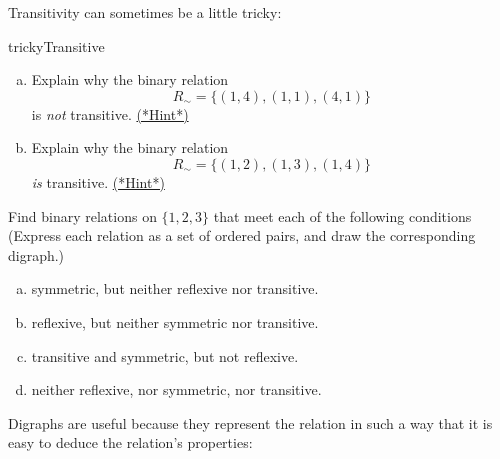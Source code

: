%

Transitivity can sometimes be a little tricky:

\begin{exercise}{trickyTransitive}
\begin{enumerate}[(a)]
\item
Explain why the binary relation 
\[ R_{\sim} = \{(1,4), (1,1),(4,1) \} \]
is \emph{not} transitive.
\hyperref[secEqRelChapHints]{(*Hint*)} 
\item
Explain why the binary relation 
\[ R_{\sim} = \{(1,2), (1,3),(1,4) \} \]
\emph{is} transitive.
\hyperref[secEqRelChapHints]{(*Hint*)}
\end{enumerate}
\end{exercise}

\begin{exer} \label{BinRelSomePropsEx}
Find binary relations on $\{1,2,3\}$ that meet each of the following conditions 
(Express each relation as a set of ordered pairs, and draw the corresponding digraph.)
\begin{enumerate}[(a)]
\item \label{BinRelSomePropsEx-symmonly}
symmetric, but neither reflexive nor transitive.
\item \label{BinRelSomePropsEx-refonly}
 reflexive, but neither symmetric nor transitive.
\item \label{BinRelSomePropsEx-transandsymm}
transitive and symmetric, but not reflexive.
\item \label{BinRelSomePropsEx-none}
neither reflexive, nor symmetric, nor transitive.
\end{enumerate}
\end{exer}
Digraphs are useful because they represent the relation in such a way that it is easy to deduce the relation's properties: 

